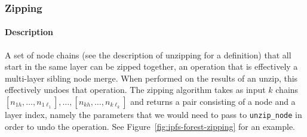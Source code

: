 \afterpage{\clearpage}
\newpage

\subsubsection{Zipping}

\paragraph{Description}

A set of node chains (see the description of unzipping for a definition) that all start in the same layer can be zipped together, an operation that is effectively a multi-layer sibling node merge. When performed on the results of an unzip, this effectively undoes that operation. The zipping algorithm takes as input $k$ chains $[n_{1h},\ldots,n_{1\ell_1}], \ldots, [n_{kh},\ldots,n_{k\ell_k}]$ and returns a pair consisting of a node and a layer index, namely the parameters that we would need to pass to \texttt{unzip_node} in order to undo the operation. See Figure~\ref{fig:ipfs-forest-zipping} for an example.

